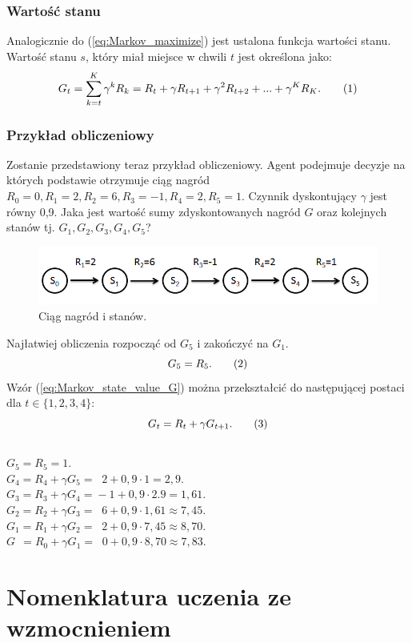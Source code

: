 \documentclass[12pt]{book}
\theoremstyle{plain}
\newcommand\addtag{\refstepcounter{equation}
\renewcommand{\labelenumii}{\theenumii}
\renewcommand{\theenumii}{\theenumi.\arabic{enumii}.}
\tag{\theequation}}
\newcommand{\myref}[1]{(\ref{#1})}
\begin{document}
\subsubsection*{Wartość stanu}
Analogicznie do (\ref{eq:Markov_maximize}) jest ustalona funkcja wartości stanu. Wartość stanu $s$, który miał miejsce w chwili $t$ jest określona jako:
\[
G_t=\sum_{k=t}^{K} \gamma^k R_{k}=R_{t}+\gamma R_{t+1}+\gamma^{2} R_{t+2}+...+\gamma^{K}R_K. \addtag \label{eq:Markov_state_value_G}
\]
\subsubsection*{Przykład obliczeniowy}
Zostanie przedstawiony teraz przykład obliczeniowy. Agent podejmuje decyzje na których podstawie otrzymuje ciąg  nagród $R_0=0, R_1=2,R_2=6,R_3=-1,R_4=2,R_5=1$. Czynnik dyskontujący $\gamma$ jest równy 0,9. Jaka jest wartość sumy zdyskontowanych nagród $G$ oraz kolejnych stanów tj. $G_1,G_2,G_3,G_4,G_5$?\\
\begin{figure}[H]
	\centering
	\includegraphics[width=14cm]{rewards-graph}
	\caption{Ciąg nagród i stanów.}
	\label{fig:agent-srodowisko}
\end{figure}\noindent
Najłatwiej obliczenia rozpocząć od $G_5$ i zakończyć na $G_1$.
\[G_5=R_5.  \addtag\]
Wzór \myref{eq:Markov_state_value_G} można przekształcić do następującej postaci dla $t \in \{1,2,3,4\}$:
\[G_{t}=R_{t}+\gamma G_{t+1} \label{eq:G_reccurential}. \addtag \]\\
$G_5=R_5=1.$\\
$G_4=R_4+\gamma G_{5}=\;\;2+0,9\cdot 1=2,9.$\\
$G_3=R_3+\gamma G_{4}=\!-1+0,9\cdot2.9=1,61.$\\
$G_2=R_2+\gamma G_{3}=\;\;6+0,9\cdot1,61 \approx 7,45.$\\
$G_1=R_1+\gamma G_{2}=\;\;2+0,9\cdot 7,45 \approx 8,70.$\\
$G\;\,=R_0+\gamma G_{1}=\;\;0+0,9\cdot 8,70 \approx 7,83.$\\

\section{Nomenklatura uczenia ze wzmocnieniem}
\end{document}
